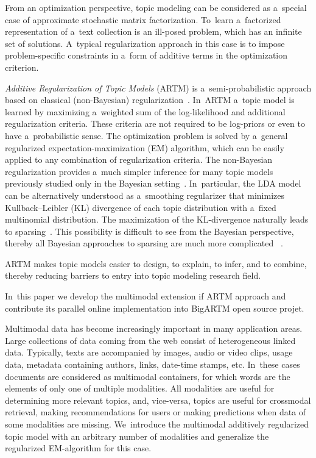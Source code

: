 \documentclass{acm_proc_article-sp}
\begin{document}
From an optimization perspective,
topic modeling can be considered as a~special case
of approximate stochastic matrix factorization.
To~learn a~factorized representation of a~text collection
is an ill-posed problem, which has an infinite set of solutions.
A~typical regularization approach in this case is
to impose problem-specific constraints
in a~form of additive terms in the optimization criterion.

\emph{Additive Regularization of Topic Models} (ARTM)
is a~semi-probabilistic approach based on classical (non-Bayesian) regularization~\cite{voron14dan-eng}.
In~ARTM a~topic model is learned by maximizing a~weighted sum
of the log-likelihood and additional regularization criteria.
These criteria are not required to be log-priors or even to have a~probabilistic sense.
The optimization problem is solved by a~general regularized expectation-maximization (EM) algorithm,
which can be easily applied to any combination of regularization criteria.
The non-Bayesian regularization provides a~much simpler inference
for many topic models previously studied only in the Bayesian setting~\cite{voron14aist,voron14mlj}.
In~particular,
the LDA model can be alternatively understood as a~smoothing regularizer
that minimizes Kullback--Leibler (KL) divergence
of each topic distribution with a~fixed multinomial distribution.
The maximization of the KL-divergence naturally leads to sparsing~\cite{voron14aist}.
This possibility is difficult to see from the Bayesian perspective,
thereby all Bayesian approaches to sparsing are much more complicated~%
\cite{shashanka07sparse,wang09decoupling,ugander11concave,eisenstein11sparse,chien13bayesian}.

ARTM makes topic models easier to design, to explain, to infer, and to combine,
thereby reducing barriers to entry into topic modeling research field.

In~this paper we develop the multimodal extension if ARTM approach
and contribute its parallel online implementation into BigARTM open source projet.

Multimodal data has become increasingly important in many application areas.
Large collections of data coming from the web %
consist of heterogeneous linked data.
Typically, texts are accompanied by images, audio or video clips, usage data,
metadata containing authors, links, date-time stamps, etc.
In~these cases documents are considered as multimodal containers,
for which words are the elements of only one of multiple modalities.
All modalities are useful for determining more relevant topics,
and, vice-versa,
topics are useful for crossmodal retrieval, 
making recommendations for users or 
making predictions when data of some modalities are missing.
We~introduce the multimodal additively regularized topic model
with an arbitrary number of modalities
and generalize the regularized EM-algorithm for this case.
\end{document}
